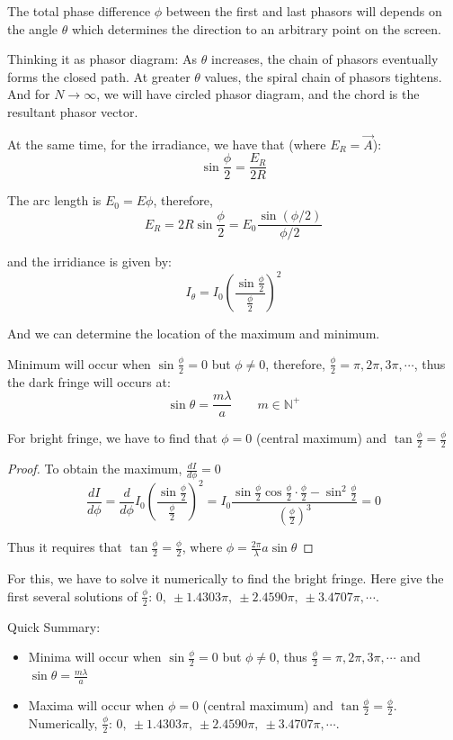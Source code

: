 \documentclass[openany]{book}
\begin{document}
The total phase difference $\phi $ between the first and last phasors will depends on the angle $\theta $ which determines the direction to an arbitrary point on the screen.

Thinking it as phasor diagram: As $\theta $ increases, the chain of phasors eventually forms the closed path. At greater $\theta $ values, the spiral chain of phasors tightens. And for $N\to \infty$, we will have circled phasor diagram, and the chord is the resultant phasor vector. 

At the same time, for the irradiance, we have that (where $E_R =\vec{A}$):
\[\sin \frac{\phi}{2}=\frac{E_R}{2R}\]

The arc length is $E_0=E\phi $, therefore,
\[E_R=2R\sin \frac{\phi }{2}=E_0\frac{\sin (\phi /2)}{\phi /2}\]

and the irridiance is given by:
\[I_{\theta }=I_0\left(\frac{\sin \frac{\phi}{2} }{\frac{\phi }{2}}\right)^2\]

And we can determine the location of the maximum and minimum. 

Minimum will occur when $\sin \frac{\phi }{2} =0$ but $\phi \neq 0$, therefore, $\frac{\phi}{2} =\pi,2\pi,3\pi,\cdots $, thus the dark fringe will occurs at:
\[\sin \theta =\frac{m\lambda }{a}\qquad m\in \mathbb{N}^+\]

For bright fringe, we have to find that $\phi =0$ (central maximum) and $\tan \frac{\phi }{2}= \frac{\phi }{2}$
\begin{proof}
To obtain the maximum, $\frac{dI}{d\phi }=0$
\[\frac{dI}{d\phi}=\frac{d}{d\phi}I_0\left(\frac{\sin \frac{\phi}{2}}{\frac{\phi }{2}}\right)^2=I_0\frac{\sin \frac{\phi }{2}\cos \frac{\phi }{2}\cdot \frac{\phi }{2}-\sin ^2\frac{\phi }{2}}{(\frac{\phi }{2})^3}=0\]

Thus it requires that $\tan \frac{\phi }{2}= \frac{\phi }{2}$, where $\phi =\frac{2\pi }{\lambda }a\sin \theta$
\end{proof}

For this, we have to solve it numerically to find the bright fringe. Here give the first several solutions of $\frac{\phi }{2}$: $0,\  \pm 1.4303\pi,\  \pm 2.4590\pi,\  \pm 3.4707\pi,\cdots $.

Quick Summary:
\begin{itemize}
\item Minima will occur when $\sin \frac{\phi }{2} =0$ but $\phi \neq 0$, thus $\frac{\phi}{2} =\pi,2\pi,3\pi,\cdots $ and $\sin \theta =\frac{m\lambda }{a}$
\item Maxima will occur when $\phi =0$ (central maximum) and $\tan \frac{\phi }{2}= \frac{\phi }{2}$. Numerically, $\frac{\phi }{2}$: $0,\  \pm 1.4303\pi,\  \pm 2.4590\pi,\  \pm 3.4707\pi,\cdots $.
\end{itemize}
\end{document}
